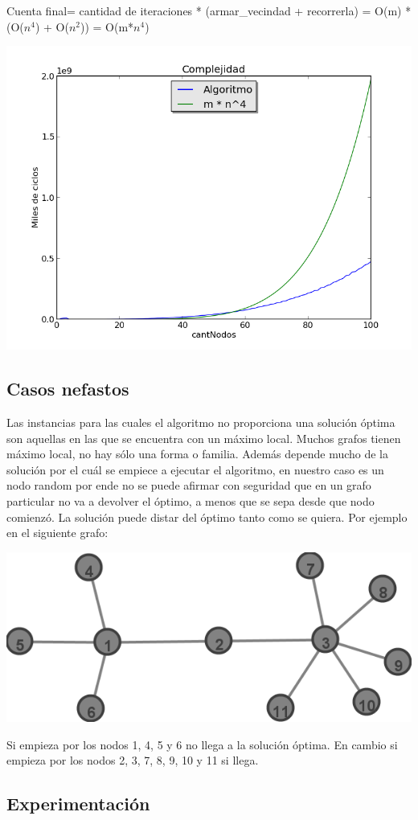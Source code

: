 Cuenta final= cantidad de iteraciones * (armar\_vecindad + recorrerla) = O(m) * (O($n^4$) + O($n^2$)) = O(m*$n^4$)
\begin{center}
\includegraphics[scale=0.8]{Images/complejidad.png} 
\end{center}

\subsection{Casos nefastos}
Las instancias para las cuales el algoritmo no proporciona una solución óptima son aquellas en las que se encuentra con un máximo local. Muchos grafos tienen máximo local, no hay sólo una forma o familia. Además depende mucho de la solución por el cuál se empiece a ejecutar el algoritmo, en nuestro caso es un nodo random por ende no se puede afirmar con seguridad que en un grafo particular no va a devolver el óptimo, a menos que se sepa desde que nodo comienzó.
La solución puede distar del óptimo tanto como se quiera.
Por ejemplo en el siguiente grafo:

\begin{center}
\includegraphics[scale=0.5]{Images/ejemploCasoMaloLocal.png} 
\end{center}

Si empieza por los nodos 1, 4, 5 y 6 no llega a la solución óptima.
En cambio si empieza por los nodos 2, 3, 7, 8, 9, 10 y 11 si llega.

\subsection{Experimentaci\'on}





